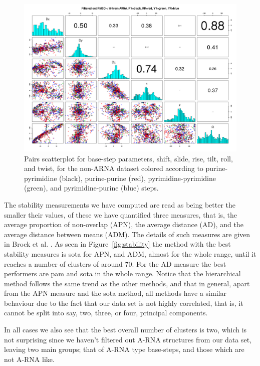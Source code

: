 \begin{figure}
 \centering
\includegraphics[angle=90, scale=0.6]{Chapter2/noarna_step.png}
\caption{Pairs  scatterplot for  base-step  parameters, shift,  slide,
  rise,  tilt,  roll, and  twist,  for  the  non-ARNA dataset  colored
  according   to  purine-pyrimidine   (black),   purine-purine  (red),
  pyrimidine-pyrimidine (green), and pyrimidine-purine (blue) steps.}
 \label{fig:pairsnoarna}
\end{figure}

The stability measurements  we have computed are read  as being better
the smaller their values, of  these we have quantified three measures,
that  is, the  average proportion  of non-overlap  (APN),  the average
distance (AD), and the average distance between means (ADM). The
details of  such measures are given  in Brock et al. \cite{brock2008}.
As  seen  in  Figure~\ref{fig:stability}  the  method  with  the  best
stability measures is  sota for APN, and ADM, almost for the whole range,
until it reaches a number of clusters of around 70. For the AD measure
the best performers are pam and  sota in the whole range.  Notice that
the hierarchical method  follows the same trend as  the other methods,
and that in  general, apart from the APN measure  and the sota method,
all methods have a similar behaviour due to the fact that our data set
is not highly  correlated, that is, it cannot be  split into say, two,
three, or four, principal components.

In all cases  we also see that the best overall  number of clusters is
two, which is not surprising since we haven't filtered out A-RNA
structures from our  data set, leaving two main  groups; that of A-RNA
type base-steps, and those which are not A-RNA like.

